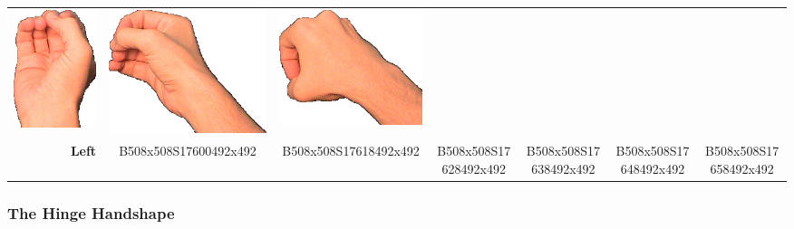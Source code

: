 \documentclass{article}
\begin{document}
\begin{center}
\begin{tabular}{r*{6}{c}}
\includegraphics[scale=0.1]{images/05-17-4.jpg}&
\includegraphics[scale=0.1]{images/05-17-5.jpg}&
\includegraphics[scale=0.1]{images/05-17-6.jpg}\\
\textbf{Left}&
B508x508S17600492x492&
B508x508S17618492x492&
B508x508S17628492x492&
B508x508S17638492x492&
B508x508S17648492x492&
B508x508S17658492x492\\
\end{tabular}
\end{center}

\subsubsection{The Hinge Handshape}
\end{document}
